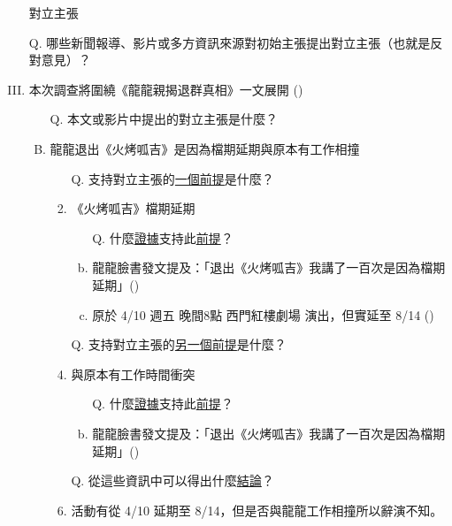 \documentclass[a4paper, 12pt]{article}
\begin{document}
\begin{enumerate}[I.]
\begin{enumerate}[A.]
\begin{enumerate}[1.]
                    \end{enumerate}
          \end{enumerate}
    \item [] {\color{red}對立主張}
    \item [Q.] 哪些新聞報導、影片或多方資訊來源對初始主張提出對立主張（也就是反對意見）？
    \item 本次調查將圍繞《龍龍親揭退群真相》一文展開 (\cite{20211001003526-260404})
          \begin{enumerate}[A.]
              \item [Q.] 本文或影片中提出的{\color{red}對立主張}是什麼？
              \item 龍龍退出《火烤呱吉》是因為檔期延期與原本有工作相撞
                    \begin{enumerate}[1.]
                        \item[Q.] 支持{\color{red}對立主張}的{\underline{一個前提}}是什麼？
                        \item 《火烤呱吉》檔期延期
                              \begin{enumerate}[a.]
                                  \item [Q.] 什麼{\underline{證據}}支持此{\underline{前提}}？
                                  \item 龍龍臉書發文提及：「退出《火烤呱吉》我講了一百次是因為檔期延期」(\cite{2091700,froggyroast})
                                  \item 原於 4/10 週五 晚間8點 西門紅樓劇場 演出，但實延至 8/14 (\cite{10158175426336462,froggyroast})
                              \end{enumerate}
                        \item [Q.] 支持{\color{red}對立主張}的{\underline{另一個前提}}是什麼？
                        \item 與原本有工作時間衝突
                              \begin{enumerate}[a.]
                                  \item [Q.] 什麼{\underline{證據}}支持此{\underline{前提}}？
                                  \item 龍龍臉書發文提及：「退出《火烤呱吉》我講了一百次是因為檔期延期」(\cite{2091700,froggyroast})
                              \end{enumerate}
                        \item [Q.] 從這些資訊中可以得出什麼{\underline{結論}}？
                        \item 活動有從 4/10 延期至 8/14，但是否與龍龍工作相撞所以辭演不知。

\end{enumerate}
\end{enumerate}
\end{enumerate}
\end{document}
